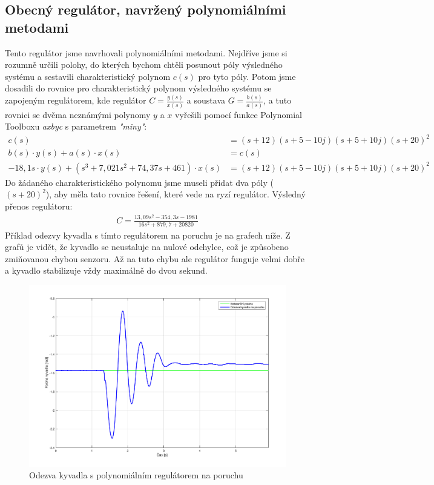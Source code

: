 \documentclass[a4paper,12pt]{article}
\begin{document}
\subsection{Obecný regulátor, navržený polynomiálními metodami}
Tento regulátor jsme navrhovali polynomiálními metodami. Nejdříve jsme si rozumně určili polohy, do kterých bychom chtěli posunout póly výsledného systému a sestavili charakteristický polynom $c(s)$ pro tyto póly. Potom jsme dosadili do rovnice pro charakteristický polynom výsledného systému se zapojeným regulátorem, kde regulátor $C = \frac{y(s)}{x(s)}$ a soustava $G = \frac{b(s)}{a(s)}$, a tuto rovnici se dvěma neznámými polynomy $y$ a $x$ vyřešili pomocí funkce Polynomial Toolboxu \textit{axbyc} s parametrem \textit{"miny"}:
\begin{align*}
c(s) &= (s + 12) (s + 5 - 10j) (s + 5 + 10j) (s + 20)^2	\\
b(s)\cdot y(s) + a(s)\cdot x(s) &= c(s)	\\
-18,1s\cdot y(s) + (s^3 + 7,021s^2 + 74,37s + 461)\cdot x(s) &=  (s + 12) (s + 5 - 10j) (s + 5 + 10j) (s + 20)^2
\end{align*}
Do žádaného charakteristického polynomu jsme museli přidat dva póly ($(s+20)^2$), aby měla tato rovnice řešení, které vede na ryzí regulátor.
\newline
Výsledný přenos regulátoru:
\begin{align*}
C = \frac{13,09s^2 - 354,3s - 1981}{16s^2 + 879,7 + 20820}
\end{align*}
Příklad odezvy kyvadla s tímto regulátorem na poruchu je na grafech níže. Z grafů je vidět, že kyvadlo se neustaluje na nulové odchylce, což je způsobeno zmiňovanou chybou senzoru.
\newline
\newline
Až na tuto chybu ale regulátor funguje velmi dobře a kyvadlo stabilizuje vždy maximálně do dvou sekund.
\begin{figure}[H]
	\centering
    \includegraphics[scale=0.55]{odezva_kyvadlo_poly}
    \caption{Odezva kyvadla s polynomiálním regulátorem na poruchu}
\end{figure}
\end{document}
